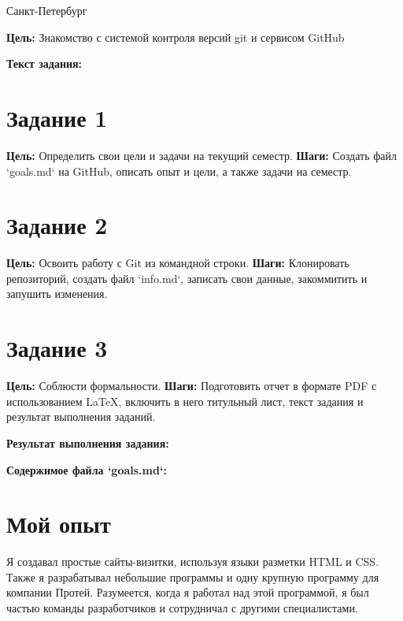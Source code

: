 \documentclass[12pt]{article}
\begin{document}
\vspace{\baselineskip}
\vspace{\baselineskip}
\vspace{\baselineskip}
\vspace{\baselineskip}
\vspace{\baselineskip}

\begin{center}
Санкт-Петербург \the\year{}
\end{center}\par

\newpage

\noindent\textbf{Цель:}
\textbf{} Знакомство с системой контроля версий git и сервисом GitHub  

\noindent\textbf{Текст задания:}

\section*{Задание 1}
\textbf{Цель:} Определить свои цели и задачи на текущий семестр.  
\textbf{Шаги:} Создать файл `goals.md` на GitHub, описать опыт и цели, а также задачи на семестр.

\section*{Задание 2}
\textbf{Цель:} Освоить работу с Git из командной строки.  
\textbf{Шаги:} Клонировать репозиторий, создать файл `info.md`, записать свои данные, закоммитить и запушить изменения.

\section*{Задание 3}
\textbf{Цель:} Соблюсти формальности.  
\textbf{Шаги:} Подготовить отчет в формате PDF с использованием LaTeX, включить в него титульный лист, текст задания и результат выполнения заданий.

\noindent\textbf{Результат выполнения задания:}

\newpage

\noindent\textbf{Содержимое файла `goals.md`:}

\section*{Мой опыт}
Я создавал простые сайты-визитки, используя языки разметки HTML и CSS. Также я разрабатывал небольшие программы и одну крупную программу для компании Протей. Разумеется, когда я работал над этой программой, я был частью команды разработчиков и сотрудничал с другими специалистами.
\end{document}
